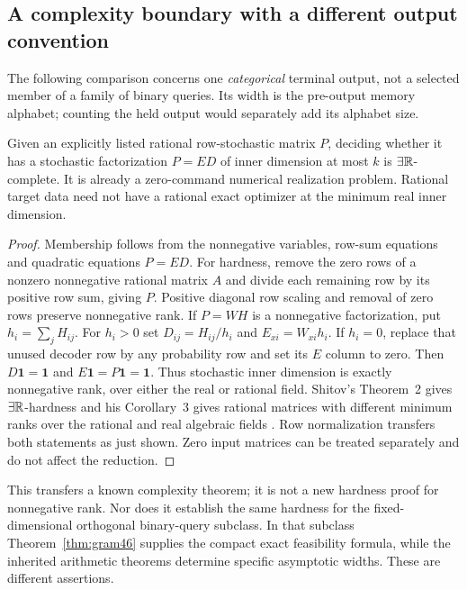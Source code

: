 \subsection{A complexity boundary with a different output convention}
The following comparison concerns one \emph{categorical} terminal
output, not a selected member of a family of binary queries.
Its width is the pre-output memory alphabet; counting the held output
would separately add its alphabet size.

\begin{proposition}\label{prop:hard46}
Given an explicitly listed rational row-stochastic matrix $P$, deciding
whether it has a stochastic factorization $P=ED$ of inner dimension at
most $k$ is $\exists\mathbb R$-complete. It is already a zero-command numerical
realization problem. Rational target data need not have a rational
exact optimizer at the minimum real inner dimension.
\end{proposition}
\begin{proof}
Membership follows from the nonnegative variables, row-sum equations
and quadratic equations $P=ED$. For hardness, remove the zero rows of
a nonzero nonnegative rational matrix $A$ and divide each remaining row
by its positive row sum, giving $P$. Positive diagonal row scaling and
removal of zero rows preserve nonnegative rank. If $P=WH$ is a
nonnegative factorization, put $h_i=\sum_jH_{ij}$. For $h_i>0$ set
$D_{ij}=H_{ij}/h_i$ and $E_{xi}=W_{xi}h_i$. If $h_i=0$, replace
that unused decoder row by any probability row and set its $E$ column
to zero. Then $D\mathbf1=\mathbf1$ and
$E\mathbf1=P\mathbf1=\mathbf1$. Thus stochastic inner dimension
is exactly nonnegative rank, over either the real or rational field.
Shitov's Theorem~2 gives $\exists\mathbb R$-hardness and his Corollary~3
gives rational matrices with different minimum ranks over the rational
and real algebraic fields \cite{Shitov18}. Row normalization transfers
both statements as just shown. Zero input matrices can be treated
separately and do not affect the reduction.
\end{proof}

This transfers a known complexity theorem; it is not a new hardness
proof for nonnegative rank. Nor does it establish the same hardness for
the fixed-dimensional orthogonal binary-query subclass. In that
subclass Theorem~\ref{thm:gram46} supplies the compact exact feasibility
formula, while the inherited arithmetic theorems determine specific
asymptotic widths. These are different assertions.
